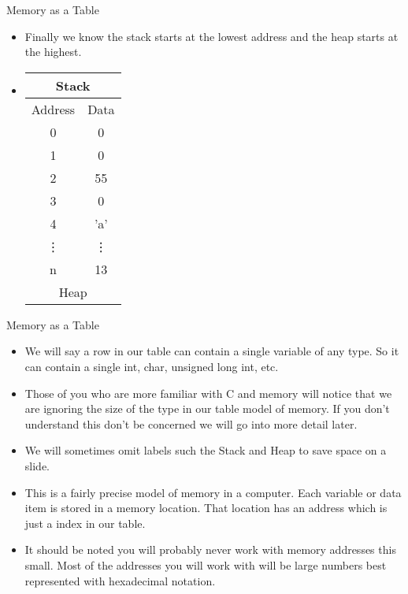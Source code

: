 \documentclass[10pt]{beamer}
\begin{document}
\begin{frame}{Memory as a Table}
\begin{itemize}[<+->]
	\item Finally we know the stack starts at the lowest address and the heap starts at the highest.
	\item 
	\begin{tabular}{|c|c|}
		\hline
		\multicolumn{2}{|c|}{Stack}\\
		\hline
		Address & Data\\
		\hline
		0 &	0\\
		\hline
		1 &	0\\
		\hline
		2 & 55\\
		\hline
		3 & 0\\
		\hline
		4 & 'a'\\
		\hline
		\vdots & \vdots \\
		\hline
		n & 13\\
		\hline
		\multicolumn{2}{|c|}{Heap}\\
		\hline
	\end{tabular}
\end{itemize}
\end{frame}

\begin{frame}{Memory as a Table}
	\begin{itemize}[<+->]
	\item We will say a row in our table can contain a single variable of any type. So it can contain a single int, char, unsigned long int, etc.

	\item Those of you who are more familiar with C and memory will notice that we are ignoring the size of the type in our table model of memory. If you don't understand this don't be concerned we will go into more detail later.

	\item We will sometimes omit labels such the Stack and Heap to save space on a slide.

	\item This is a fairly precise model of memory in a computer. Each variable or data item is stored in a memory location. That location has an address which is just a index in our table.

	\item It should be noted you will probably never work with memory addresses this small. Most of the addresses you will work with will be large numbers best represented with hexadecimal notation.
	\end{itemize}
\end{frame}
\end{document}
